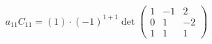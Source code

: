 \documentclass[preview]{standalone}
\begin{document}
\begin{align*}
a_{11}C_{11} = (1) \cdot (-1)^{1+1} \det\begin{pmatrix} 1 & -1 & 2 \\ 0 & 1 & -2 \\ 1 & 1 & 1 \end{pmatrix}
\end{align*}
\end{document}
